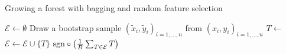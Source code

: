   \begin{algorithm}
    \caption{Growing a forest with bagging and random feature selection} \label{alg:forest}
    \begin{algorithmic}[1]
        \State $\mathcal{E} \gets \emptyset$  
          \State Draw a bootstrap sample $(\tilde{x}_i, \tilde{y}_i)_{i = 1, \ldots, n}$ from 
            $(x_i, y_i)_{i = 1, \ldots, n}$
          \State $T \gets$ 
          \State $\mathcal{E} \gets \mathcal{E} \cup \{T\}$
        \EndFor
        \State \Return $\mathrm{sgn} \circ \left( \frac{1}{B} \sum_{T \in \mathcal{E}} T \right)$
      \EndFunction
    \end{algorithmic}
  \end{algorithm}